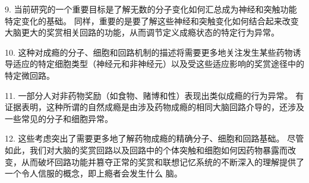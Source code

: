9. 当前研究的一个重要目标是了解无数的分子变化如何汇总成为神经和突触功能特定变化的基础。
同样，重要的是要了解这些神经和突触变化如何结合起来改变大脑更大的奖赏相关回路的功能，从而调节定义成瘾状态的特定行为异常。


10. 这种对成瘾的分子、细胞和回路机制的描述将需要更多地关注发生某些药物诱导适应的特定细胞类型（神经元和非神经元）以及受这些适应影响的奖赏途径中的特定微回路。


11. 一部分人对非药物奖励（如食物、赌博和性）表现出类似成瘾的行为异常。
有证据表明，这种所谓的自然成瘾是由涉及药物成瘾的相同大脑回路介导的，还涉及一些常见的分子和细胞异常。 


12. 这些考虑突出了需要更多地了解药物成瘾的精确分子、细胞和回路基础。
尽管如此，我们对大脑的奖赏回路以及回路中的个体突触和细胞如何因药物暴露而改变，从而破坏回路功能并篡夺正常的奖赏和联想记忆系统的不断深入的理解提供了一个令人信服的概念，即上瘾者会发生什么 脑。

